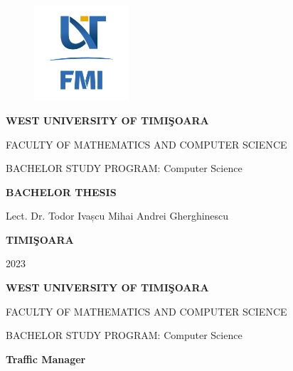 \documentclass[17pt]{report}
\begin{document}
\thispagestyle{empty}
\begin{center}
\begin{figure}[h!]
\vspace{-20pt}
\begin{center}
\includegraphics[width=100pt]{FMI-03.png}
\end{center}
\end{figure}


{\large{\bf WEST UNIVERSITY OF TIMI\c SOARA

FACULTY OF MATHEMATICS AND COMPUTER SCIENCE

BACHELOR STUDY PROGRAM: Computer Science}}

\vspace{120pt}
{\huge {\bf BACHELOR THESIS}}

\vspace{160pt}
\end{center}

{\large{}

\noindent Lect. Dr. Todor Ivașcu \hfill 
\noindent Mihai Andrei Gherghinescu
}

\vfill
\begin{center}
{\bf TIMI\c SOARA

2023}
\end{center}
\newpage
\thispagestyle{empty}
\begin{center}
{\large{\bf WEST UNIVERSITY OF TIMI\c SOARA
		
FACULTY OF MATHEMATICS AND COMPUTER SCIENCE
		
BACHELOR STUDY PROGRAM:  Computer Science}}

\vspace{200pt}
{\huge {\bf Traffic Manager }}

\vspace{153pt}
\end{center}
\end{document}
